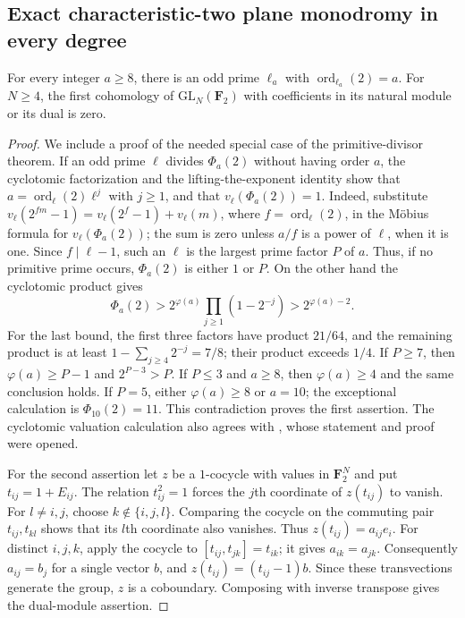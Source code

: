 \subsection{Exact characteristic-two plane monodromy in every degree}
\label{subsec:char2-uniform}

\begin{lemma}
\label{lem:char2-group-inputs}
For every integer $a\ge8$, there is an odd prime $\ell_a$ with
$\operatorname{ord}_{\ell_a}(2)=a$.
For $N\ge4$, the first cohomology of $\mathrm{GL}_N(\mathbf F_2)$
with coefficients in its natural module or its dual is zero.
\end{lemma}
\begin{proof}
We include a proof of the needed special case of the primitive-divisor
theorem. If an odd prime $\ell$ divides $\Phi_a(2)$ without having
order $a$, the cyclotomic factorization and the lifting-the-exponent
identity show that
$a=\operatorname{ord}_{\ell}(2)\ell^j$ with $j\ge1$, and that
$v_\ell(\Phi_a(2))=1$. Indeed, substitute
$v_\ell(2^{fm}-1)=v_\ell(2^f-1)+v_\ell(m)$, where
$f=\operatorname{ord}_\ell(2)$, in the M\"obius formula for
$v_\ell(\Phi_a(2))$; the sum is zero unless $a/f$ is a power of
$\ell$, when it is one. Since $f\mid\ell-1$, such an $\ell$ is the
largest prime factor $P$ of $a$. Thus, if no primitive prime occurs,
$\Phi_a(2)$ is either $1$ or $P$.
On the other hand the cyclotomic product gives
\[
 \Phi_a(2)>2^{\varphi(a)}\prod_{j\ge1}(1-2^{-j})
 >2^{\varphi(a)-2}.
\]
For the last bound, the first three factors have product $21/64$,
and the remaining product is at least
$1-\sum_{j\ge4}2^{-j}=7/8$; their product exceeds $1/4$.
If $P\ge7$, then $\varphi(a)\ge P-1$ and $2^{P-3}>P$.
If $P\le3$ and $a\ge8$, then $\varphi(a)\ge4$ and the same
conclusion holds. If $P=5$, either $\varphi(a)\ge8$ or $a=10$;
the exceptional calculation is $\Phi_{10}(2)=11$.
This contradiction proves the first assertion. The cyclotomic
valuation calculation also agrees with
\cite[Lemma~3.1(b)--(c), pp.~125--126]{GlasbyEtAl2017}, whose
statement and proof were opened.

For the second assertion let $z$ be a $1$-cocycle with values in
$\mathbf F_2^N$ and put $t_{ij}=1+E_{ij}$.
The relation $t_{ij}^2=1$ forces the $j$th coordinate of
$z(t_{ij})$ to vanish. For $l\ne i,j$, choose
$k\notin\{i,j,l\}$. Comparing the cocycle on the commuting pair
$t_{ij},t_{kl}$ shows that its $l$th coordinate also vanishes.
Thus $z(t_{ij})=a_{ij}e_i$.
For distinct $i,j,k$, apply the cocycle to
$[t_{ij},t_{jk}]=t_{ik}$; it gives $a_{ik}=a_{jk}$.
Consequently $a_{ij}=b_j$ for a single vector $b$, and
$z(t_{ij})=(t_{ij}-1)b$. Since these transvections generate the
group, $z$ is a coboundary. Composing with inverse transpose
gives the dual-module assertion.
\end{proof}

